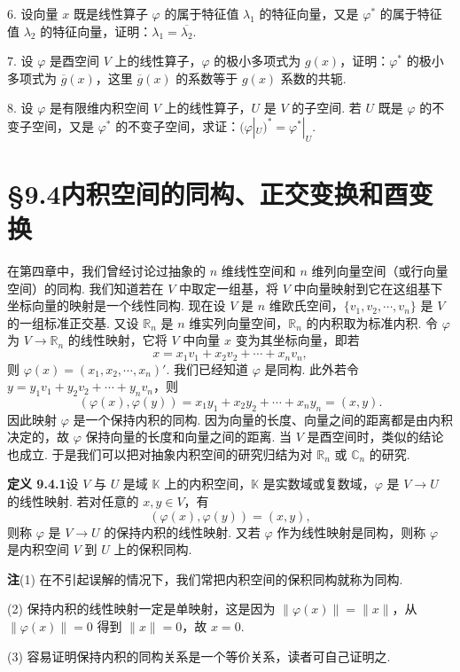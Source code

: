 \documentclass[UTF8, 12pt, fontset=fandol, oneside]{ctexart}
\begin{document}
6. 设向量 $x$ 既是线性算子 $\varphi$ 的属于特征值 $\lambda_1$ 的特征向量，又是 $\varphi^*$ 的属于特征值 $\lambda_2$ 的特征向量，证明：$\lambda_1=\overline{\lambda_2}$.

7. 设 $\varphi$ 是酉空间 $V$ 上的线性算子，$\varphi$ 的极小多项式为 $g(x)$，证明：$\varphi^*$ 的极小多项式为 $\overline{g}(x)$，这里 $\overline{g}(x)$ 的系数等于 $g(x)$ 系数的共轭.

8. 设 $\varphi$ 是有限维内积空间 $V$ 上的线性算子，$U$ 是 $V$ 的子空间. 若 $U$ 既是 $\varphi$ 的不变子空间，又是 $\varphi^*$ 的不变子空间，求证：$(\varphi|_U)^*=\varphi^*|_U$.

\section*{§9.4\quad 内积空间的同构、正交变换和酉变换}

在第四章中，我们曾经讨论过抽象的 $n$ 维线性空间和 $n$ 维列向量空间（或行向量空间）的同构. 我们知道若在 $V$ 中取定一组基，将 $V$ 中向量映射到它在这组基下坐标向量的映射是一个线性同构. 现在设 $V$ 是 $n$ 维欧氏空间，$\{v_1,v_2,\cdots,v_n\}$ 是 $V$ 的一组标准正交基. 又设 $\mathbb R_n$ 是 $n$ 维实列向量空间，$\mathbb R_n$ 的内积取为标准内积. 令 $\varphi$ 为 $V\to\mathbb R_n$ 的线性映射，它将 $V$ 中向量 $x$ 变为其坐标向量，即若
\[
  x=x_1v_1+x_2v_2+\cdots+x_nv_n,
\]
则 $\varphi(x)=(x_1,x_2,\cdots,x_n)'$. 我们已经知道 $\varphi$ 是同构. 此外若令 $y=y_1v_1+y_2v_2+\cdots+y_nv_n$，则
\[
  (\varphi(x),\varphi(y))=x_1y_1+x_2y_2+\cdots+x_ny_n=(x,y).
\]
因此映射 $\varphi$ 是一个保持内积的同构. 因为向量的长度、向量之间的距离都是由内积决定的，故 $\varphi$ 保持向量的长度和向量之间的距离. 当 $V$ 是酉空间时，类似的结论也成立. 于是我们可以把对抽象内积空间的研究归结为对 $\mathbb R_n$ 或 $\mathbb C_n$ 的研究.

\noindent\textbf{定义 9.4.1}\quad 设 $V$ 与 $U$ 是域 $\mathbb K$ 上的内积空间，$\mathbb K$ 是实数域或复数域，$\varphi$ 是 $V\to U$ 的线性映射. 若对任意的 $x,y\in V$，有
\[
  (\varphi(x),\varphi(y))=(x,y),
\]
则称 $\varphi$ 是 $V\to U$ 的保持内积的线性映射. 又若 $\varphi$ 作为线性映射是同构，则称 $\varphi$ 是内积空间 $V$ 到 $U$ 上的保积同构.

\noindent\textbf{注}\quad (1) 在不引起误解的情况下，我们常把内积空间的保积同构就称为同构.

(2) 保持内积的线性映射一定是单映射，这是因为 $\|\varphi(x)\|=\|x\|$，从 $\|\varphi(x)\|=0$ 得到 $\|x\|=0$，故 $x=0$.

(3) 容易证明保持内积的同构关系是一个等价关系，读者可自己证明之.
\end{document}
